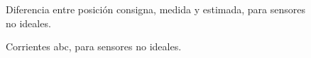 \documentclass[a4paper, 10pt, onecolumn,journal]{ieeeconf}
\begin{document}
\begin{figure}[H]
	\centering
	\begin{adjustbox}{scale=0.55,max width=\columnwidth}
	\end{adjustbox}
	\caption{Diferencia entre posición consigna, medida y estimada, para sensores no ideales.}
	\label{Diferencia entre posición consigna,medida y observada, para sensores no ideales}
\end{figure}

\begin{figure}[H]
	\centering
	\begin{adjustbox}{scale=0.55,max width=\columnwidth}
	\end{adjustbox}
	\caption{Corrientes abc, para sensores no ideales.}
	\label{Corrientes abc, para sensores no ideales}
\end{figure}
\end{document}
